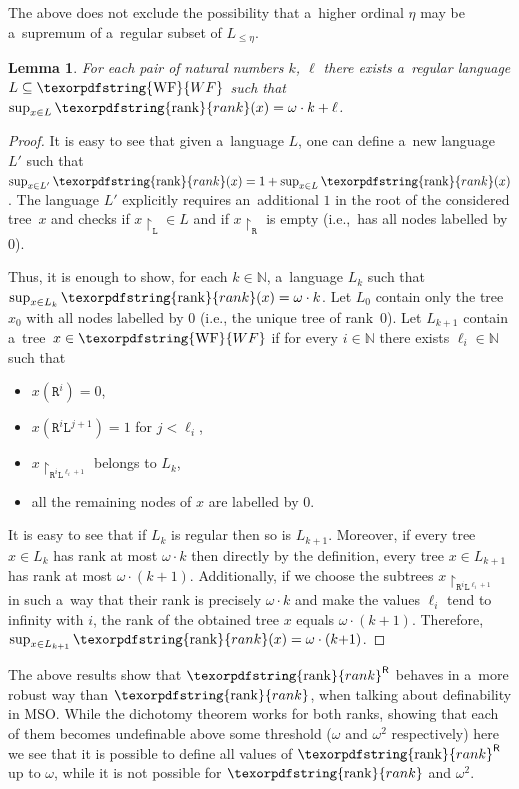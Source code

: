 \documentclass[11pt,a4paper]{amsart}
\theoremstyle{plain}
\newtheorem{lem}[thm]{Lemma}
\theoremstyle{definition}
\theoremstyle{defC}
\theoremstyle{thmC}
\theoremstyle{plain}
\numberwithin{equation}{section}
\numberwithin{equation}{section}
\numberwithin{figure}{section}
\newcommand{\ident}[1]{\ensuremath{\texorpdfstring{\mathrm{\mathnm{#1}}}{#1}}\xspace}
\newcommand{\domain}[1]{\ensuremath{\mathbb{#1}}\xspace}
\newcommand{\N}{\domain{N}}
\newcommand{\dL}{\mathtt{{\scriptstyle L}}}
\newcommand{\dR}{\mathtt{{\scriptstyle R}}}
\newcommand{\mathnm}[1]{#1}
\newcommand{\restr}{{\upharpoonright}}
\newcommand{\WF}{\ident{WF}}
\newcommand{\sR}{\mathsf{R}}
\newcommand{\rank}{\ident{rank}}
\newcommand{\rankR}{\ident{rank}^\sR}
\begin{document}
The above  does not exclude the
possibility that a~higher ordinal $\eta$ may be a~supremum of a~regular
subset of $L_{\leq\eta}$.

\begin{lem}\label{lem:construct-ordinals}
	For each pair of natural numbers $k$, $\ell$ there exists a~regular language $L\subseteq\WF$ such that $\sup_{x\in L} \rank(x)=\omega\cdot k+\ell$.
\end{lem}

\begin{proof}
	It is easy to see that given a~language $L$, one can define a~new language $L'$ such that $\sup_{x\in L'}\rank(x)=1+\sup_{x\in L}\rank(x)$.
	The language $L'$ explicitly requires an~additional $1$ in the root of the considered tree~$x$ and checks if $x\restr_\dL\in L$ and if $x\restr_\dR$ is empty (i.e.,~has all nodes labelled by $0$).

	Thus, it is enough to show, for each $k\in\N$, a~language $L_k$ such that $\sup_{x\in L_k}\rank(x)=\omega\cdot k$.
	Let $L_0$ contain only the tree $x_0$ with all nodes labelled by $0$ (i.e., the unique tree of rank~$0$).
	Let $L_{k+1}$ contain a~tree~$x\in \WF$ if for every $i\in\N$ there exists $\ell_i\in\N$ such that
	\begin{itemize}
	\item $x(\dR^i)=0$,
	\item $x(\dR^i\dL^{j+1})=1$ for $j<\ell_i$,
	\item $x\restr_{\dR^i\dL^{\ell_i+1}}$ belongs to $L_k$,
	\item all the remaining nodes of $x$ are labelled by $0$.
	\end{itemize}
	It is easy to see that if $L_k$ is regular then so is $L_{k+1}$.
	Moreover, if every tree $x\in L_k$ has rank at most $\omega\cdot k$ then directly by the definition, every tree $x\in L_{k+1}$ has rank at most $\omega\cdot (k{+}1)$.
	Additionally, if we choose the subtrees $x\restr_{\dR^i\dL^{\ell_i+1}}$ in such a~way that their rank is precisely $\omega\cdot k$ and make the values $\ell_i$ tend to infinity with $i$,
	the rank of the obtained tree $x$ equals $\omega\cdot (k{+}1)$.
	Therefore, $\sup_{x\in L_{k+1}}\rank(x)=\omega\cdot (k{+}1)$.
\end{proof}

The above results show that $\rankR$ behaves in a~more robust way than $\rank$, when talking about definability in MSO.
While the dichotomy theorem works for both ranks, showing that each of them becomes undefinable above some threshold ($\omega$ and $\omega^2$ respectively)
here we see that it is possible to define all values of $\rankR$ up to $\omega$, while it is not possible for $\rank$ and $\omega^2$.
\end{document}
